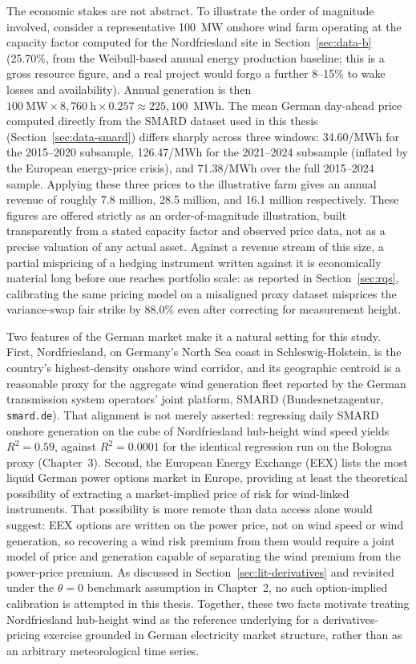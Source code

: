 \documentclass[11pt, a4paper, twoside]{article}
\begin{document}
The economic stakes are not abstract. To illustrate the order of magnitude involved, consider a representative 100~MW onshore wind farm operating at the capacity factor computed for the Nordfriesland site in Section~\ref{sec:data-b} (25.70\%, from the Weibull-based annual energy production baseline; this is a gross resource figure, and a real project would forgo a further 8--15\% to wake losses and availability). Annual generation is then $100~\text{MW} \times 8{,}760~\text{h} \times 0.257 \approx 225{,}100$~MWh. The mean German day-ahead price computed directly from the SMARD dataset used in this thesis (Section~\ref{sec:data-smard}) differs sharply across three windows: \texteuro{}34.60/MWh for the 2015--2020 subsample, \texteuro{}126.47/MWh for the 2021--2024 subsample (inflated by the European energy-price crisis), and \texteuro{}71.38/MWh over the full 2015--2024 sample. Applying these three prices to the illustrative farm gives an annual revenue of roughly \texteuro{}7.8 million, \texteuro{}28.5 million, and \texteuro{}16.1 million respectively. These figures are offered strictly as an order-of-magnitude illustration, built transparently from a stated capacity factor and observed price data, not as a precise valuation of any actual asset. Against a revenue stream of this size, a partial mispricing of a hedging instrument written against it is economically material long before one reaches portfolio scale: as reported in Section~\ref{sec:rqs}, calibrating the same pricing model on a misaligned proxy dataset misprices the variance-swap fair strike by 88.0\% even after correcting for measurement height.

Two features of the German market make it a natural setting for this study. First, Nordfriesland, on Germany's North Sea coast in Schleswig-Holstein, is the country's highest-density onshore wind corridor, and its geographic centroid is a reasonable proxy for the aggregate wind generation fleet reported by the German transmission system operators' joint platform, SMARD (Bundesnetzagentur, \texttt{smard.de}). That alignment is not merely asserted: regressing daily SMARD onshore generation on the cube of Nordfriesland hub-height wind speed yields $R^2 = 0.59$, against $R^2 = 0.0001$ for the identical regression run on the Bologna proxy (Chapter~3). Second, the European Energy Exchange (EEX) lists the most liquid German power options market in Europe, providing at least the theoretical possibility of extracting a market-implied price of risk for wind-linked instruments. That possibility is more remote than data access alone would suggest: EEX options are written on the power price, not on wind speed or wind generation, so recovering a wind risk premium from them would require a joint model of price and generation capable of separating the wind premium from the power-price premium. As discussed in Section~\ref{sec:lit-derivatives} and revisited under the $\theta = 0$ benchmark assumption in Chapter~2, no such option-implied calibration is attempted in this thesis. Together, these two facts motivate treating Nordfriesland hub-height wind as the reference underlying for a derivatives-pricing exercise grounded in German electricity market structure, rather than as an arbitrary meteorological time series.
\end{document}
